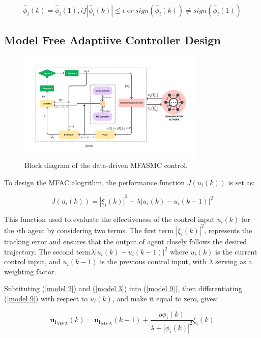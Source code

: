 \documentclass[journal,onecolumn]{IEEEtran}
\begin{document}
\begin{equation}
    \label{model 8}
    \hat{\phi}_i(k) = \hat{\phi}_i(1), if |\hat{\phi}_i(k) | \leq \epsilon \ or \ sign(\hat{\phi}_i(k)) \neq  sign(\hat{\phi}_i(1))
\end{equation}

\subsection{Model Free Adaptiive Controller Design}

\begin{figure}[h!]
    \centering
    \includegraphics[width=0.8\textwidth]{diagram.png}
    \caption{Block diagram of the data-driven MFASMC control.}
    \label{fig:diagram} %
\end{figure}

To design the MFAC alogrithm, the performance function \(J(u_i(k))\) is set as:

\begin{equation}
    \label{model 9}
    J(u_i(k)) = |\xi_i(k)|^2 + \lambda|u_i(k) - u_i(k-1)|^2
\end{equation}

This function used to evaluate the effectiveness of the control input \(u_i(k)\) for the $i$th agent by considering two terms. The first term \(|\xi_i(k)|^2\), represents the tracking error and ensures that the output of agent closely follows the desired trajectory. The second term\(\lambda|u_i(k) - u_i(k-1)|^2\) where \(u_i(k)\) is the current control input, and \(u_i(k-1)\) is the previous control input, with \(\lambda\) serving as a weighting factor.

Subtituting (\ref{model 2}) and (\ref{model 3}) into (\ref{model 9}), then differentiating (\ref{model 9}) with respect to \(u_i(k)\), and make it equal to zero, gives:

\begin{equation}
    \label{model eq:mfac}
    \mathbf{u_i}_{\text{MFA}}(k) = \mathbf{u_i}_{\text{MFA}}(k - 1) + \frac{\rho \phi_i(k)}{\lambda + |\phi_i(k)|^2} \xi_i(k)
\end{equation}
\end{document}
